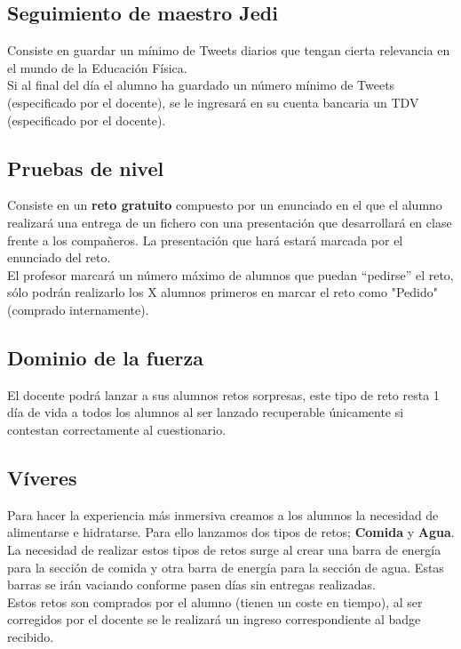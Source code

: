 \subsection{Seguimiento de maestro Jedi}
Consiste en guardar un mínimo de Tweets diarios que tengan cierta relevancia en el mundo de la Educación Física.\\

Si al final del día el alumno ha guardado un número mínimo de Tweets (especificado por el docente), se le ingresará en su cuenta bancaria un TDV (especificado por el docente).

\subsection{Pruebas de nivel}
Consiste en un \textbf{reto gratuito} compuesto por un enunciado en el que el alumno realizará una entrega de un fichero con una presentación que desarrollará en clase frente a los compañeros. La presentación que hará estará marcada por el enunciado del reto.\\

El profesor marcará un número máximo de alumnos que puedan ``pedirse'' el reto, sólo podrán realizarlo los X alumnos primeros en marcar el reto como "Pedido" (comprado internamente).

\subsection{Dominio de la fuerza}
El docente podrá lanzar a sus alumnos retos sorpresas, este tipo de reto resta 1 día de vida a todos los alumnos al ser lanzado recuperable únicamente si contestan correctamente al cuestionario.

\subsection{Víveres}
Para hacer la experiencia más inmersiva creamos a los alumnos la necesidad de alimentarse e hidratarse. Para ello lanzamos dos tipos de retos; \textbf{Comida} y \textbf{Agua}. La necesidad de realizar estos tipos de retos surge al crear una barra de energía para la sección de comida y otra barra de energía para la sección de agua. Estas barras se irán vaciando conforme pasen días sin entregas realizadas.\\

Estos retos son comprados por el alumno (tienen un coste en tiempo), al ser corregidos por el docente se le realizará un ingreso correspondiente al badge recibido.\\

